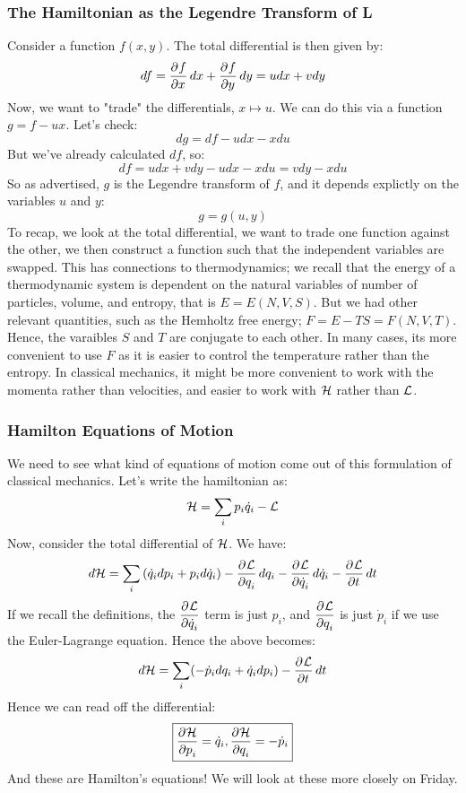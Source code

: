 \documentclass[../PHYS306Notes.tex]{subfiles}
\begin{document}
\subsubsection{The Hamiltonian as the Legendre Transform of L}
Consider a function $f(x,y)$. The total differential is then given by:
\[df = \dpd{f}{x}dx + \dpd{f}{y}dy  = udx + vdy\]
Now, we want to "trade" the differentials, $x \mapsto u$. We can do this via a function $g = f - ux$. Let's check:
\[dg = df - udx - xdu\]
But we've already calculated $df$, so:
\[df = udx + vdy - udx - xdu = vdy - xdu\]
So as advertised, $g$ is the Legendre transform of $f$, and it depends explictly on the variables $u$ and $y$:
\[g = g(u, y)\]
To recap, we look at the total differential, we want to trade one function against the other, we then construct a function such that the independent variables are swapped. This has connections to thermodynamics; we recall that the energy of a thermodynamic system is dependent on the natural variables of number of particles, volume, and entropy, that is $E = E(N, V, S)$. But we had other relevant quantities, such as the Hemholtz free energy; $F = E - TS = F(N, V, T)$. Hence, the varaibles $S$ and $T$ are conjugate to each other. In many cases, its more convenient to use $F$ as it is easier to control the temperature rather than the entropy. In classical mechanics, it might be more convenient to work with the momenta rather than velocities, and easier to work with $\mathcal{H}$ rather than $\mathcal{L}$. 

\subsubsection{Hamilton Equations of Motion}
We need to see what kind of equations of motion come out of this formulation of classical mechanics. Let's write the hamiltonian as:
\[\mathcal{H} = \sum_i p_i\dot{q}_i - \mathcal{L}\]
Now, consider the total differential of $\mathcal{H}$. We have:
\[d\HH = \sum_i \left(\dot{q}_i dp_i + p_i d\dot{q}_i\right) - \dpd{\LL}{q_i}dq_i - \dpd{\LL}{\dot{q}_i}d\dot{q}_i - \dpd{\LL}{t}dt\]
If we recall the definitions, the $\dpd{\LL}{\dot{q}_i}$ term is just $p_i$, and $\dpd{\LL}{q_i}$ is just $\dot{p}_i$ if we use the Euler-Lagrange equation. Hence the above becomes:
\[d\HH = \sum_i (-\dot{p}_idq_i + \dot{q}_idp_i) - \dpd{\LL}{t}dt\]
Hence we can read off the differential:
\[\boxed{\dpd{\HH}{p_i} = \dot{q}_i, \dpd{\HH}{q_i} = -\dot{p}_i}\]
And these are Hamilton's equations! We will look at these more closely on Friday.
\end{document}
